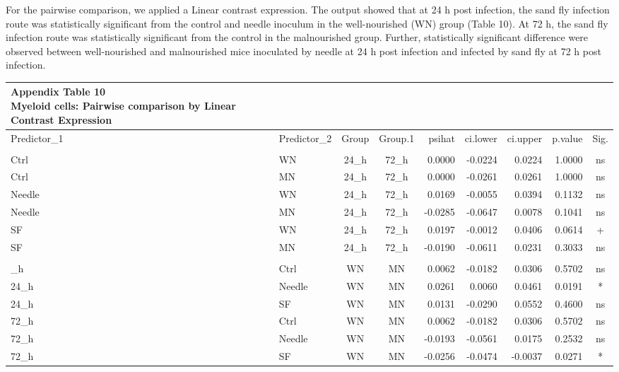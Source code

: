 \documentclass[
  12pt,
  letterpaper,
]{article}
\begin{document}
For the pairwise comparison, we applied a Linear contrast expression. The output showed that at 24 h post infection, the sand fly infection route was statistically significant from the control and needle inoculum in the well-nourished (WN) group (Table 10). At 72 h, the sand fly infection route was statistically significant from the control in the malnourished group. Further, statistically significant difference were observed between well-nourished and malnourished mice inoculated by needle at 24 h post infection and infected by sand fly at 72 h post infection.

\begin{longtable}{llccrrrrc}
\caption*{
{\large \textbf{Appendix Table 10}} \\ 
{\small \textbf{Myeloid cells: Pairwise comparison by Linear Contrast Expression}}
} \\ 
\toprule
Predictor\_1 & Predictor\_2 & Group & Group.1 & psihat & ci.lower & ci.upper & p.value & Sig. \\ 
\midrule\addlinespace[2.5pt]
\multicolumn{9}{l}{Predictor: Time\_point} \\ 
\midrule\addlinespace[2.5pt]
Ctrl & WN & 24\_h & 72\_h & 0.0000 & -0.0224 & 0.0224 & 1.0000 & ns \\ 
Ctrl & MN & 24\_h & 72\_h & 0.0000 & -0.0261 & 0.0261 & 1.0000 & ns \\ 
Needle & WN & 24\_h & 72\_h & 0.0169 & -0.0055 & 0.0394 & 0.1132 & ns \\ 
Needle & MN & 24\_h & 72\_h & -0.0285 & -0.0647 & 0.0078 & 0.1041 & ns \\ 
SF & WN & 24\_h & 72\_h & 0.0197 & -0.0012 & 0.0406 & 0.0614 & + \\ 
SF & MN & 24\_h & 72\_h & -0.0190 & -0.0611 & 0.0231 & 0.3033 & ns \\ 
\midrule\addlinespace[2.5pt]
\multicolumn{9}{l}{Predictor: Diet} \\ 
\midrule\addlinespace[2.5pt]
24\_h & Ctrl & WN & MN & 0.0062 & -0.0182 & 0.0306 & 0.5702 & ns \\ 
24\_h & Needle & WN & MN & 0.0261 & 0.0060 & 0.0461 & 0.0191 & * \\ 
24\_h & SF & WN & MN & 0.0131 & -0.0290 & 0.0552 & 0.4600 & ns \\ 
72\_h & Ctrl & WN & MN & 0.0062 & -0.0182 & 0.0306 & 0.5702 & ns \\ 
72\_h & Needle & WN & MN & -0.0193 & -0.0561 & 0.0175 & 0.2532 & ns \\ 
72\_h & SF & WN & MN & -0.0256 & -0.0474 & -0.0037 & 0.0271 & * \\ 

\end{longtable}
\end{document}

